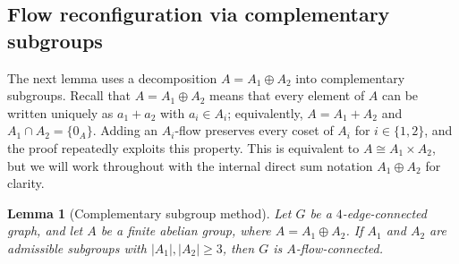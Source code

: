 \documentclass[a4paper,12pt]{article}
\theoremstyle{plain}
\newtheorem{lem}[theorem]{Lemma}
\theoremstyle{definition}
\renewcommand\ge\geqslant
\begin{document}
\subsection{Flow reconfiguration via complementary subgroups}


The next lemma uses a decomposition $A=A_1\oplus A_2$ into complementary subgroups. Recall that $A=A_1\oplus A_2$ means that every element of $A$ can be written uniquely as $a_1+a_2$ with $a_i\in A_i$; equivalently, $A=A_1+A_2$ and $A_1\cap A_2=\{0_A\}$. Adding an $A_i$-flow preserves every coset of $A_i$ for $i\in\{1,2\}$, and the proof repeatedly exploits this property. This is equivalent to $A\cong A_1\times A_2$, but we will work throughout with the internal direct sum notation $A_1\oplus A_2$ for clarity.

\begin{lem}[Complementary subgroup method]
    \label{2group-flow-thm}
    Let $G$ be a $4$-edge-connected graph, and let $A$ be a finite abelian group,  where $A=A_1\oplus A_2$.
    If $A_1$ and $A_2$ are admissible subgroups with $|A_1|,|A_2|\ge 3$, then $G$ is $A$-flow-connected.
\end{lem}
\end{document}
